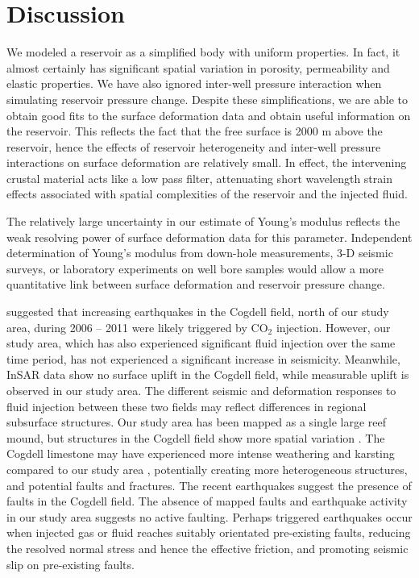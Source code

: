 \section{Discussion}
We modeled a reservoir as a simplified body with uniform properties.  In fact, it almost certainly has significant spatial variation in porosity, permeability and elastic properties.  We have also ignored inter-well pressure interaction when simulating reservoir pressure change.  Despite these simplifications, we are able to obtain good fits to the surface deformation data and obtain useful information on the reservoir.  This reflects the fact that the free surface is 2000 m above the reservoir, hence the effects of reservoir heterogeneity and inter-well pressure interactions on surface deformation are relatively small.  In effect, the intervening crustal material acts like a low pass filter, attenuating short wavelength strain effects associated with spatial complexities of the reservoir and the injected fluid.  

The relatively large uncertainty in our estimate of Young’s modulus reflects the weak resolving power of surface deformation data for this parameter.  Independent determination of Young’s modulus from down-hole measurements, 3-D seismic surveys, or laboratory experiments on well bore samples would allow a more quantitative link between surface deformation and reservoir pressure change.

\citet{gan2013gas} suggested that increasing earthquakes in the Cogdell field, north of our study area, during 2006 – 2011 were likely triggered by CO$_{2}$ injection.  However, our study area, which has also experienced significant fluid injection over the same time period, has not experienced a significant increase in seismicity.  Meanwhile, InSAR data show no surface uplift in the Cogdell field, while measurable uplift is observed in our study area.  The different seismic and deformation responses to fluid injection between these two fields may reflect differences in regional subsurface structures.  Our study area has been mapped as a single large reef mound, but structures in the Cogdell field show more spatial variation \cite{vest1970oil}. The Cogdell limestone may have experienced more intense weathering and karsting compared to our study area \cite{reid1991cogdell}, potentially creating more heterogeneous structures, and potential faults and fractures.  The recent earthquakes suggest the presence of faults in the Cogdell field.   The absence of mapped faults and earthquake activity in our study area suggests no active faulting.  Perhaps triggered earthquakes occur when injected gas or fluid reaches suitably orientated pre-existing faults, reducing the resolved normal stress and hence the effective friction, and promoting seismic slip on pre-existing faults.  

